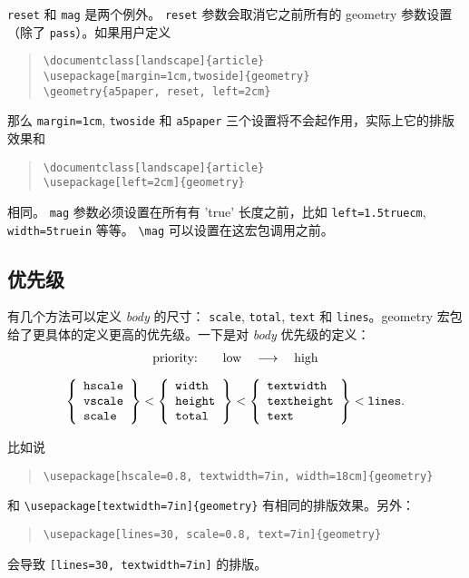 \documentclass[titlepage]{ctexart}
\def\Gm{\textsf{geometry}}
\newcommand{\gpart}[1]{\textsf{\textsl{\color[rgb]{.0,.45,.7}#1}}}
\begin{document}
	\verb|reset| 和 \verb|mag| 是两个例外。
	\verb|reset| 参数会取消它之前所有的 geometry 参数设置（除了 \verb|pass|）。如果用户定义
	\begin{quote}
	\verb|\documentclass[landscape]{article}|\\
	\verb|\usepackage[margin=1cm,twoside]{geometry}|\\
	\verb|\geometry{a5paper, reset, left=2cm}|
	\end{quote}
	那么 \verb|margin=1cm|, \verb|twoside| 和 \verb|a5paper| 三个设置将不会起作用，实际上它的排版效果和
	\begin{quote}
	\verb|\documentclass[landscape]{article}|\\
	\verb|\usepackage[left=2cm]{geometry}|
	\end{quote}	
	相同。
	\verb|mag| 参数必须设置在所有有 'true' 长度之前，比如 \verb|left=1.5truecm|, \verb|width=5truein| 等等。 \verb|\mag| 可以设置在这宏包调用之前。
	
	\subsection{优先级}\label{sec:priority}
	
	有几个方法可以定义 \gpart{body} 的尺寸： \verb|scale|, \verb|total|, \verb|text| 和 \verb|lines|。\Gm{} 宏包给了更具体的定义更高的优先级。一下是对 \gpart{body} 优先级的定义：
	 \[\begin{array}{c}
 \textrm{priority:}\qquad\textrm{low}\quad
    \longrightarrow\quad\textrm{high}\\[1em]
 \left\{\begin{array}{l}\verb|hscale|\\ \verb|vscale|\\ \verb|scale|
        \end{array}\right\} <
 \left\{\begin{array}{l}\verb|width|\\ \verb|height|\\ \verb|total|
        \end{array}\right\} <
 \left\{\begin{array}{l}\verb|textwidth|\\ \verb|textheight|
         \\\verb|text|\end{array}\right\} < \verb|lines|.
 \end{array}\]
 
	 比如说
	 \begin{quote}
	 \verb|\usepackage[hscale=0.8, textwidth=7in, width=18cm]{geometry}|
	 \end{quote}
	 和 \verb|\usepackage[textwidth=7in]{geometry}| 有相同的排版效果。另外：
	 \begin{quote}
	 \verb|\usepackage[lines=30, scale=0.8, text=7in]{geometry}|
	 \end{quote}
	 会导致 \texttt{[lines=30, textwidth=7in]} 的排版。
	 
\end{document}
